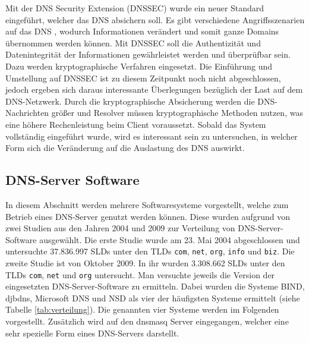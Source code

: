 \documentclass[a4paper, 12pt, BCOR10mm, DIV12, toc=bibliography, toc=listof, german]{scrbook}
\begin{document}
				Mit der DNS Security Extension (DNSSEC) \cite{rfc4033,rfc4034,rfc4035,liualb2006} wurde ein
				neuer Standard eingeführt, welcher das DNS absichern soll. Es gibt verschiedene
				Angriffsszenarien auf das DNS \cite{lorenz2012}, wodurch Informationen verändert und somit
				ganze Domains übernommen werden können. Mit DNSSEC soll die Authentizität und
				Datenintegrität der Informationen gewährleistet werden und überprüfbar sein. Dazu werden
				kryptographische Verfahren eingesetzt. Die Einführung und Umstellung auf DNSSEC ist zu
				diesem Zeitpunkt noch nicht abgeschlossen, jedoch ergeben sich daraus interessante
				Überlegungen bezüglich der Last auf dem DNS-Netzwerk. Durch die kryptographische
				Absicherung werden die DNS-Nachrichten größer und Resolver müssen kryptographische
				Methoden nutzen, was eine höhere Rechenleistung beim Client voraussetzt. Sobald das
				System vollständig eingeführt wurde, wird es interessant sein zu untersuchen, in welcher
				Form sich die Veränderung auf die Auslastung des DNS auswirkt.



			\subsection{DNS-Server Software} %
			\label{sub:software}
			
				In diesem Abschnitt werden mehrere Softwaresysteme vorgestellt, welche zum Betrieb eines
				DNS-Server genutzt werden können. Diese wurden aufgrund von zwei Studien aus den Jahren 2004
				und 2009 zur Verteilung von DNS-Server-Software ausgewählt. Die erste Studie
				\cite{survey2004} wurde am 23. Mai 2004 abgeschlossen und untersuchte 37.836.997 SLDs unter
				den TLDs \texttt{com}, \texttt{net}, \texttt{org},	\texttt{info} und \texttt{biz}. Die
				zweite Studie \cite{survey2009} ist von Oktober 2009. In ihr wurden 3.308.662 SLDs unter den
				TLDs \texttt{com}, \texttt{net} und \texttt{org} untersucht. Man versuchte jeweils die
				Version der eingesetzten DNS-Server-Software zu ermitteln. Dabei wurden die Systeme BIND,
				djbdns, Microsoft DNS und NSD als vier der häufigsten Systeme ermittelt (siehe Tabelle
				\ref{tab:verteilung}). Die genannten vier Systeme werden im Folgenden vorgestellt.
				Zusätzlich wird auf den dnsmasq Server eingegangen, welcher eine sehr spezielle Form eines
				DNS-Servers darstellt.
				
\end{document}
